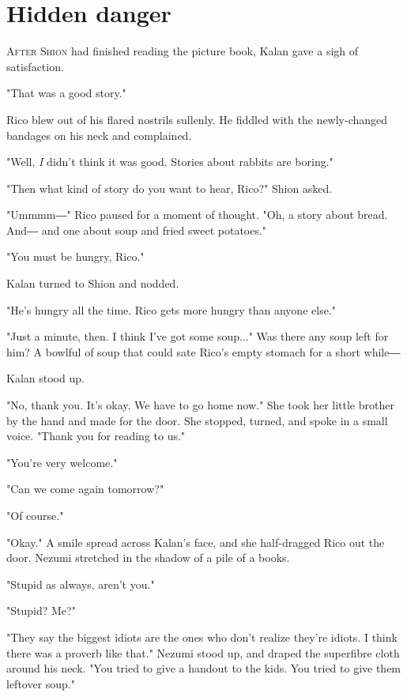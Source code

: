 
\chapter{Hidden danger}


\lettrine{A}{fter Shion} had finished reading the picture book, Kalan gave a sigh of
satisfaction.

"That was a good story."

Rico blew out of his flared nostrils sullenly. He fiddled with the
newly-changed bandages on his neck and complained.

"Well, \emph{I} didn't think it was good. Stories about rabbits are boring."

"Then what kind of story do you want to hear, Rico?" Shion asked.

"Ummmm―" Rico paused for a moment of thought. "Oh, a story about bread.
And― and one about soup and fried sweet potatoes."

"You must be hungry, Rico."

Kalan turned to Shion and nodded.

"He's hungry all the time. Rico gets more hungry than anyone else."

"Just a minute, then. I think I've got some soup..." Was there any soup
left for him? A bowlful of soup that could sate Rico's empty stomach for
a short while―

Kalan stood up.

"No, thank you. It's okay. We have to go home now." She took her little
brother by the hand and made for the door. She stopped, turned, and
spoke in a small voice. "Thank you for reading to us."

"You're very welcome."

"Can we come again tomorrow?"

"Of course."

"Okay." A smile spread across Kalan's face, and she half-dragged Rico
out the door. Nezumi stretched in the shadow of a pile of a books.

"Stupid as always, aren't you."

"Stupid? Me?"

"They say the biggest idiots are the ones who don't realize they're
idiots. I think there was a proverb like that." Nezumi stood up, and
draped the superfibre cloth around his neck. "You tried to give a
handout to the kids. You tried to give them leftover soup."

